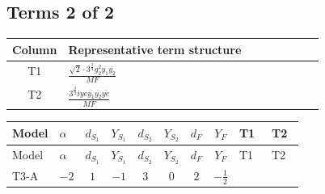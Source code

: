 \documentclass[8pt]{article}
\begin{document}
\begin{landscape}
\subsection*{Terms 2 of 2}
\begin{center}
\begin{tabular}{@{}c >{\raggedright\arraybackslash}p{0.82\linewidth}@{}}
\toprule
Column & Representative term structure \\
\midrule
T1 & \(\displaystyle \frac{\sqrt{2} \cdot 3^{\frac{3}{4}} g_{2}^{2} \overline{y_{1}} \overline{y_{2}}}{MF}\) \\
\midrule
T2 & \(\displaystyle \frac{3^{\frac{3}{4}} i ye \overline{y_{1}} \overline{y_{2}} \overline{ye}}{MF}\) \\
\midrule
\bottomrule
\end{tabular}
\end{center}
\smallskip
\tiny
\begin{longtable}{@{}llcccccc >{\raggedright\arraybackslash}p{0.21\linewidth} >{\raggedright\arraybackslash}p{0.21\linewidth}@{}}
\toprule
Model & $\alpha$ & $d_{S_1}$ & $Y_{S_1}$ & $d_{S_2}$ & $Y_{S_2}$ & $d_F$ & $Y_F$ & T1 & T2 \\
\midrule
\endfirsthead
\toprule
Model & $\alpha$ & $d_{S_1}$ & $Y_{S_1}$ & $d_{S_2}$ & $Y_{S_2}$ & $d_F$ & $Y_F$ & T1 & T2 \\
\midrule
\endhead
T3-A & $-2$ & $1$ & $-1$ & $3$ & $0$ & $2$ & $-\frac{1}{2}$ & \scriptsize\adjustbox{max width=\linewidth}{$\begin{gathered} \frac{\sqrt{2} \cdot 3^{\frac{3}{4}} g_{2}^{2} \overline{y_{1}} \overline{y_{2}}}{3 MF}\end{gathered}$} & \scriptsize\adjustbox{max width=\linewidth}{$\begin{gathered} \frac{3^{\frac{3}{4}} i ye \overline{y_{1}} \overline{y_{2}} \overline{ye}}{12 MF}\end{gathered}$} \\
\midrule
\bottomrule
\end{longtable}
\clearpage

\end{landscape}
\end{document}
